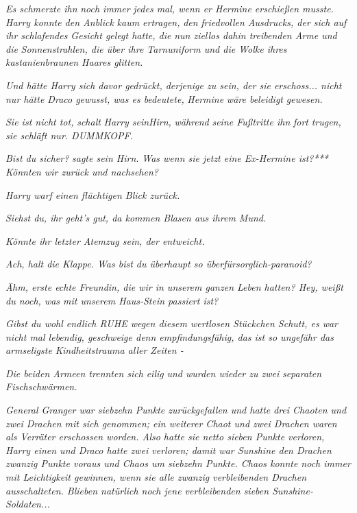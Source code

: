 {\emph{Es schmerzte ihn} \emph{noch immer} \emph{jedes mal, wenn er Hermine erschießen musste. Harry konnte den Anblick} \emph{kaum ertragen,} \emph{den} \emph{friedvollen Ausdrucks, der sich auf ihr schlafendes Gesicht gelegt hatte, die} \emph{nun ziellos dahin treibenden Arme und die} \emph{Sonnenstrahlen, die über ihre Tarnuniform und die Wolke ihres kastanienbraunen Haares glitten.}

\emph{Und hätte Harry sich davor gedrückt, derjenige zu sein, der sie erschoss... nicht nur hätte Draco gewusst, was es bedeutete,} \emph{\emph{Hermine}} \emph{wäre beleidigt} \emph{gewesen.}

\emph{\emph{Sie ist nicht tot,}} \emph{schalt} \emph{Harry seinHirn,} \emph{während} \emph{seine Fußtritte ihn} \emph{fort} \emph{trugen,} \emph{\emph{sie schläft nur. DUMMKOPF.}}

\emph{\emph{Bist du sicher?}} \emph{sagte sein Hirn.} \emph{\emph{Was wenn sie jetzt eine Ex-Hermine ist?}***} \emph{\emph{Könnten wir zurück und nachsehen?}}

\emph{Harry warf einen flüchtigen Blick zurück.}

\emph{\emph{Siehst du, ihr geht's gut, da kommen Blasen aus ihrem Mund.}}

\emph{\emph{Könnte ihr letzter Atemzug sein, der entweicht.}}

\emph{\emph{Ach, halt die Klappe. Was bist du überhaupt so überfürsorglich-paranoid?}}

\emph{\emph{Ähm, erste echte Freundin, die wir in unserem ganzen Leben hatten? Hey, weißt du noch, was mit unserem Haus-Stein passiert ist?}}

\emph{\emph{Gibst du wohl endlich RUHE wegen diesem wertlosen Stückchen Schutt, es war nicht mal lebendig, geschweige denn empfindungsfähig, das ist so ungefähr das armseligste Kindheitstrauma aller Zeiten -}}

\emph{Die beiden Armeen trennten sich} \emph{eilig} \emph{und wurden wieder zu zwei} \emph{separaten} \emph{Fischschwärmen.}

\emph{General Granger war siebzehn Punkte zurückgefallen und hatte} \emph{drei Chaoten und zwei Drachen mit sich genommen; ein weiterer Chaot und zwei Drachen waren als Verräter erschossen worden. Also hatte sie netto sieben Punkte verloren, Harry einen und Draco hatte zwei verloren; damit war Sunshine den Drachen zwanzig Punkte voraus und Chaos um siebzehn Punkte. Chaos konnte noch immer mit Leichtigkeit gewinnen, wenn sie alle zwanzig verbleibenden Drachen ausschalteten. Blieben natürlich noch jene verbleibenden sieben Sunshine-Soldaten...}

}
